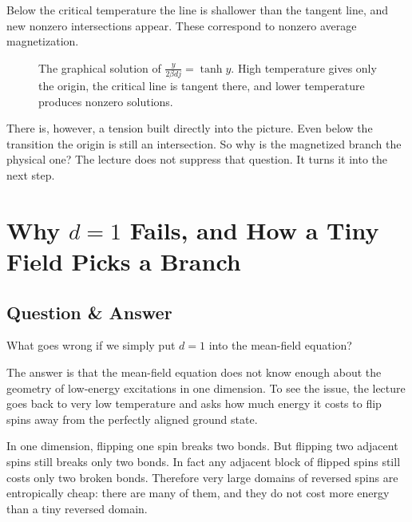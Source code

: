 Below the critical temperature the line is shallower than the tangent line, and new nonzero intersections appear. These correspond to nonzero average magnetization.

\begin{figure}[ht]
\centering
{}
\caption{The graphical solution of \(\frac{y}{2\beta d j}=\tanh y\). High temperature gives only the origin, the critical line is tangent there, and lower temperature produces nonzero solutions.}
\end{figure}

There is, however, a tension built directly into the picture. Even below the transition the origin is still an intersection. So why is the magnetized branch the physical one? The lecture does not suppress that question. It turns it into the next step.

\section{Why \(d=1\) Fails, and How a Tiny Field Picks a Branch}

\subsection{Question \& Answer}

What goes wrong if we simply put \(d=1\) into the mean-field equation?

The answer is that the mean-field equation does not know enough about the geometry of low-energy excitations in one dimension. To see the issue, the lecture goes back to very low temperature and asks how much energy it costs to flip spins away from the perfectly aligned ground state.

In one dimension, flipping one spin breaks two bonds. But flipping two adjacent spins still breaks only two bonds. In fact any adjacent block of flipped spins still costs only two broken bonds. Therefore very large domains of reversed spins are entropically cheap: there are many of them, and they do not cost more energy than a tiny reversed domain.

